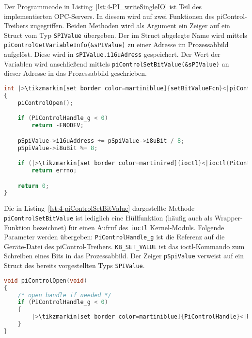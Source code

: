Der Programmcode in Listing~\ref{lst:4-PI_writeSingleIO} ist Teil des implementierten OPC-Servers. In diesem wird auf zwei Funktionen des piControl-Treibers zugegriffen. 
Beiden Methoden wird als Argument ein Zeiger auf ein Struct vom Typ \lstinline{SPIValue} übergeben. Der im Struct abgelegte Name wird mittels \lstinline{piControlGetVariableInfo(&sPIValue)} zu einer Adresse im Prozessabbild aufgelöst. Diese wird in \lstinline{sPIValue.i16uAdress} gespeichert. Der Wert der Variablen wird anschließend mittels \lstinline{piControlSetBitValue(&sPIValue)} an dieser Adresse in das Prozessabbild geschrieben.

\begin{lstlisting}[language={c},firstnumber=309,caption={Methode \lstinline{piControlSetBitValue} in \lstinline{piControlIf.c}\label{lst:4-piControlSetBitValue}}]
int |>\tikzmarkin[set border color=martiniblue]{setBitValueFcn}<|piControlSetBitValue(SPIValue *pSpiValue)|>\tikzmarkend{setBitValueFcn}<|
{
    piControlOpen();

    if (PiControlHandle_g < 0)
	    return -ENODEV;

    pSpiValue->i16uAddress += pSpiValue->i8uBit / 8;
    pSpiValue->i8uBit %= 8;

    if (|>\tikzmarkin[set border color=martinired]{ioctl}<|ioctl(PiControlHandle_g, KB_SET_VALUE, pSpiValue)|>\tikzmarkend{ioctl}<| < 0)
	    return errno;

    return 0;
}
\end{lstlisting}

Die in Listing~\ref{lst:4-piControlSetBitValue} dargestellte Methode \lstinline{piControlSetBitValue} ist lediglich eine Hüllfunktion (häufig auch als Wrapper-Funktion bezeichnet) für einen Aufruf des \lstinline{ioctl} Kernel-Moduls.
Folgende Parameter werden übergeben:
\lstinline{PiControlHandle_g} ist die Referenz auf die Geräte-Datei des piControl-Treibers. \lstinline{KB_SET_VALUE} ist das ioctl-Kommando zum Schreiben eines Bits in das Prozessabbild. Der Zeiger \lstinline{pSpiValue} verweist auf ein Struct des bereits vorgestellten Typs \lstinline{SPIValue}.

\begin{lstlisting}[language={c},firstnumber=80,caption={Methode \lstinline{piControlOpen} in \lstinline{piControlIf.c}\label{lst:4-piControlOpen}}]
void piControlOpen(void)
{
    /* open handle if needed */
    if (PiControlHandle_g < 0)
    {
	    |>\tikzmarkin[set border color=martiniblue]{PiControlHandle}<|PiControlHandle_g = open(PICONTROL_DEVICE, O_RDWR)|>\tikzmarkend{PiControlHandle}<|;
    }
}
\end{lstlisting}

